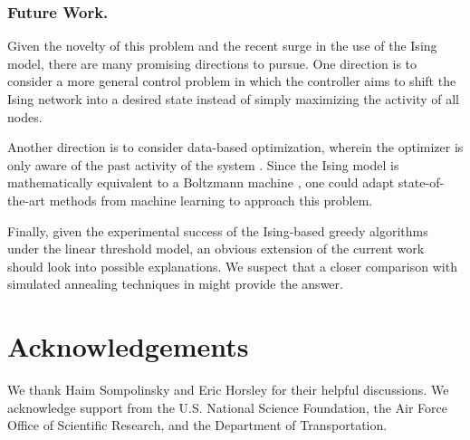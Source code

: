 \documentclass[letterpaper]{article} %
\begin{document}
\subsubsection{Future Work.} Given the novelty of this problem and the recent surge in the use of the Ising model, there are many promising directions to pursue. One direction is to consider a more general control problem in which the controller aims to shift the Ising network into a desired state instead of simply maximizing the activity of all nodes. 

Another direction is to consider data-based optimization, wherein the optimizer is only aware of the past activity of the system \cite{Goyal-02}. Since the Ising model is mathematically equivalent to a Boltzmann machine \cite{Coughlin-01}, one could adapt state-of-the-art methods from machine learning to approach this problem. 

Finally, given the experimental success of the Ising-based greedy algorithms under the linear threshold model, an obvious extension of the current work should look into possible explanations. We suspect that a closer comparison with simulated annealing techniques in \cite{Jiang-01} might provide the answer.

\section{Acknowledgements}

We thank Haim Sompolinsky and Eric Horsley for their helpful discussions. We acknowledge support from the U.S. National Science Foundation, the Air Force Office of Scientific Research, and the Department of Transportation.



\end{document}
